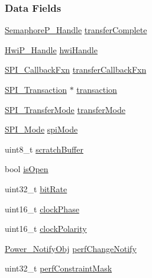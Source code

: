 \subsubsection*{Data Fields}
\begin{DoxyCompactItemize}
\item 
\hyperlink{_semaphore_p_8h_a7f34865f33e666455692544e5f12d1f2}{Semaphore\+P\+\_\+\+Handle} \hyperlink{struct_s_p_i_m_s_p432_d_m_a___object_aaeab9f08da3f972b118eed52f910ad97}{transfer\+Complete}
\item 
\hyperlink{_hwi_p_8h_a7dd325ff62af296374efc6d317f5e368}{Hwi\+P\+\_\+\+Handle} \hyperlink{struct_s_p_i_m_s_p432_d_m_a___object_ae7a15463b7e1b39158c622e10f8dd188}{hwi\+Handle}
\item 
\hyperlink{_s_p_i_8h_a207e2d5a7e7ea5606b6995b6485ca015}{S\+P\+I\+\_\+\+Callback\+Fxn} \hyperlink{struct_s_p_i_m_s_p432_d_m_a___object_ad0c5ac127447fb06a8c828ef3fd4ba7a}{transfer\+Callback\+Fxn}
\item 
\hyperlink{struct_s_p_i___transaction}{S\+P\+I\+\_\+\+Transaction} $\ast$ \hyperlink{struct_s_p_i_m_s_p432_d_m_a___object_a05b6c0fd159850420ff9a570c3ff1d63}{transaction}
\item 
\hyperlink{_s_p_i_8h_ab9ea76c6529d6076eee5e1c4a5a92c6f}{S\+P\+I\+\_\+\+Transfer\+Mode} \hyperlink{struct_s_p_i_m_s_p432_d_m_a___object_af414c465c1098091d71e78dfdee87d32}{transfer\+Mode}
\item 
\hyperlink{_s_p_i_8h_a60a7e3d74577b38aa79ea6983362f942}{S\+P\+I\+\_\+\+Mode} \hyperlink{struct_s_p_i_m_s_p432_d_m_a___object_a98354f5be961668bc9f84f8b72cd1e2c}{spi\+Mode}
\item 
uint8\+\_\+t \hyperlink{struct_s_p_i_m_s_p432_d_m_a___object_a3ac4986e89011038ca16b0f6d8b84ab5}{scratch\+Buffer}
\item 
bool \hyperlink{struct_s_p_i_m_s_p432_d_m_a___object_a571c98c29615c8dd011411ec82c41238}{is\+Open}
\item 
uint32\+\_\+t \hyperlink{struct_s_p_i_m_s_p432_d_m_a___object_a5bf783201ee3399790af448309d33468}{bit\+Rate}
\item 
uint16\+\_\+t \hyperlink{struct_s_p_i_m_s_p432_d_m_a___object_ac24d2509614352fc8c402630361e0af4}{clock\+Phase}
\item 
uint16\+\_\+t \hyperlink{struct_s_p_i_m_s_p432_d_m_a___object_a220f50e882118ee1e7ae2aff7d760fa2}{clock\+Polarity}
\item 
\hyperlink{struct_power___notify_obj}{Power\+\_\+\+Notify\+Obj} \hyperlink{struct_s_p_i_m_s_p432_d_m_a___object_afec2111a389af94c8e34e8233b5f73e2}{perf\+Change\+Notify}
\item 
uint32\+\_\+t \hyperlink{struct_s_p_i_m_s_p432_d_m_a___object_ab06a1117c1056a9af4bce3eca2d77d8e}{perf\+Constraint\+Mask}
\end{DoxyCompactItemize}


